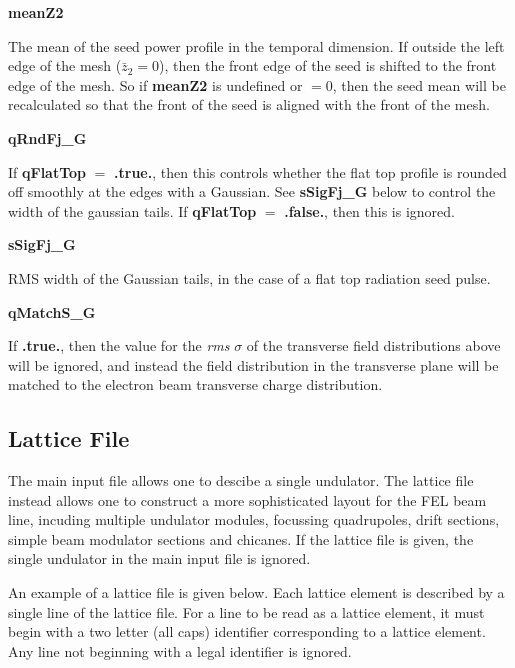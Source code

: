 \documentclass[12pt]{article}%
\begin{document}
{\bf meanZ2}

The mean of the seed power profile in the temporal dimension. If outside the left edge of the mesh ($\bar{z}_2 = 0$), then the front edge of the seed is shifted to the front edge of the mesh. So if {\bf meanZ2} is undefined or $=0$, then the seed mean will be recalculated so that the front of the seed is aligned with the front of the mesh.



{\bf qRndFj\_G}

If {\bf qFlatTop} $=$ {\bf .true.}, then this controls whether the flat top profile is rounded off smoothly at the edges with a Gaussian. See {\bf sSigFj\_G} below to control the width of the gaussian tails. If {\bf qFlatTop} $=$ {\bf .false.}, then this is ignored.


{\bf sSigFj\_G}

RMS width of the Gaussian tails, in the case of a flat top radiation seed pulse.

{\bf qMatchS\_G}

If {\bf .true.}, then the value for the \textit{rms} $\sigma$ of the transverse field distributions above will be ignored, and instead the field distribution in the transverse plane will be matched to the electron beam transverse charge distribution.



\newpage

\subsection{Lattice File}

The main input file allows one to descibe a single undulator. The lattice file instead allows one to construct a more sophisticated layout for the FEL beam line, incuding multiple undulator modules, focussing quadrupoles, drift sections, simple beam modulator sections and chicanes. If the lattice file is given, the single undulator in the main input file is ignored.

An example of a lattice file is given below. Each lattice element is described by a single line of the lattice file. For a line to be read as a lattice element, it must begin with a two letter (all caps) identifier corresponding to a lattice element. Any line not beginning with a legal identifier is ignored.
\end{document}
